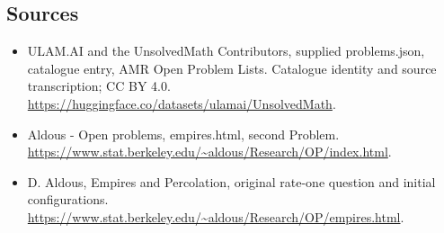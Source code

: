 \documentclass[11pt,a4paper]{article}
\begin{document}
\subsection{Sources}
\begin{itemize}
\item[S1] ULAM.AI and the UnsolvedMath Contributors, supplied problems.json, catalogue entry, AMR Open Problem Lists. Catalogue identity and source transcription; CC BY 4.0.
\url{https://huggingface.co/datasets/ulamai/UnsolvedMath}.
\item[S2] Aldous - Open problems, empires.html, second Problem. 
\url{https://www.stat.berkeley.edu/~aldous/Research/OP/index.html}.
\item[S3] D. Aldous, Empires and Percolation, original rate-one question and initial configurations.
\url{https://www.stat.berkeley.edu/~aldous/Research/OP/empires.html}.
\end{itemize}
\end{document}
